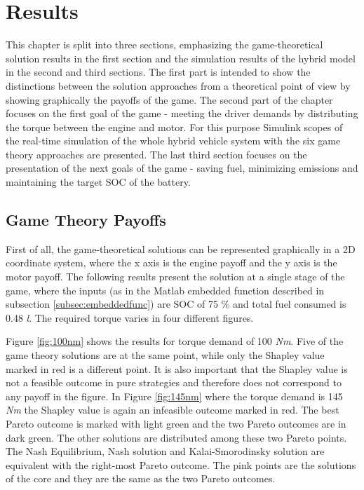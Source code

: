 \chapter{Results}
\label{chp:results}

This chapter is split into three sections, emphasizing the game-theoretical solution results in the first section and the simulation results of the hybrid model in the second and third sections. The first part is intended to show the distinctions between the solution approaches from a theoretical point of view by showing graphically the payoffs of the game. The second part of the chapter focuses on the first goal of the game - meeting the driver demands by distributing the torque between the engine and motor. For this purpose Simulink scopes of the real-time simulation of the whole hybrid vehicle system with the six game theory approaches are presented. The last third section focuses on the presentation of the next goals of the game - saving fuel, minimizing emissions and maintaining the target SOC of the battery.

\section{Game Theory Payoffs}
First of all, the game-theoretical solutions can be represented graphically in a 2D coordinate system, where the x axis is the engine payoff and the y axis is the motor payoff. The following results present the solution at a single stage of the game, where the inputs (as in the Matlab embedded function described in subsection \ref{subsec:embeddedfunc}) are SOC of 75 \% and total fuel consumed is 0.48 \textit{l}. The required torque varies in four different figures. 

Figure \ref{fig:100nm} shows the results for torque demand of 100 \textit{Nm}. Five of the game theory solutions are at the same point, while only the Shapley value marked in red is a different point. It is also important that the Shapley value is not a feasible outcome in pure strategies and therefore does not correspond to any payoff in the figure. In Figure \ref{fig:145nm} where the torque demand is 145 \textit{Nm} the Shapley value is again an infeasible outcome marked in red. The best Pareto outcome is marked with light green and the two Pareto outcomes are in dark green. The other solutions are distributed among these two Pareto points. The Nash Equilibrium, Nash solution and Kalai-Smorodinsky solution are equivalent with the right-most Pareto outcome. The pink points are the solutions of the core and they are the same as the two Pareto outcomes.

